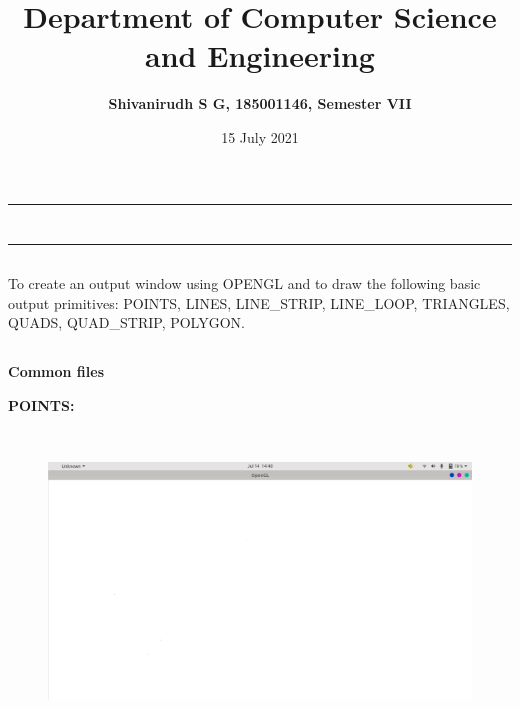 \documentclass[12pt,letterpaper]{article}
\title{\textbf{Department of Computer Science and Engineering}}
\author{\textbf{Shivanirudh S G, 185001146, Semester VII }}
\date{15 July 2021}
\begin{document}
\maketitle
\hrule
\section*{}
\hrule 
\bigskip\bigskip

\subsection*{}

\subsection*{}
\begin{flushleft}
    To create an output window using OPENGL and to draw the following basic output primitives: POINTS, LINES, LINE\_STRIP, LINE\_LOOP, TRIANGLES, QUADS, QUAD\_STRIP, POLYGON.    
\end{flushleft}

\subsection*{}
\textbf{Common files}
\begin{flushleft}



\end{flushleft}
\newpage
\textbf{POINTS:}

\textbf{}
\begin{figure}[h]
    \centering
    \includegraphics[height=8cm, keepaspectratio]{Basics/Outputs/Points.png}
\end{figure}
\end{document}

